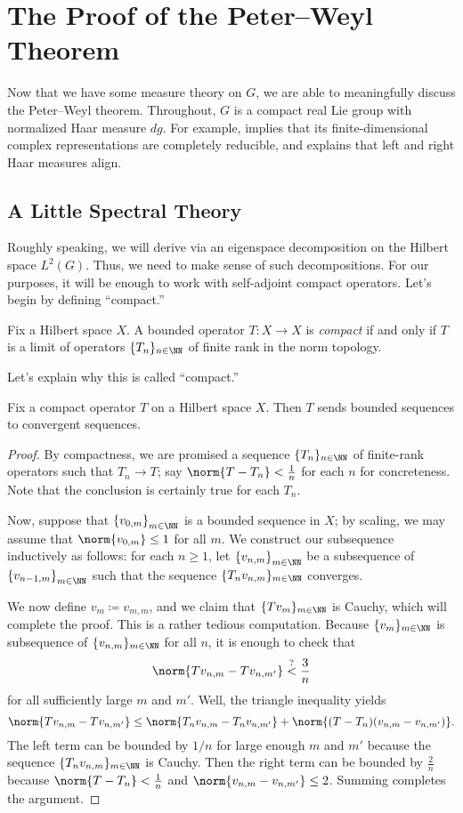 \documentclass{amsart}
\begin{document}
\section{The Proof of the Peter--Weyl Theorem} \label{sec:pw}
Now that we have some measure theory on $G$, we are able to meaningfully discuss the Peter--Weyl theorem. Throughout, $G$ is a compact real Lie group with normalized Haar measure $dg$. For example,  implies that its finite-dimensional complex representations are completely reducible, and  explains that left and right Haar measures align.

\subsection{A Little Spectral Theory}
Roughly speaking, we will derive  via an eigenspace decomposition on the Hilbert space $L^2(G)$. Thus, we need to make sense of such decompositions. For our purposes, it will be enough to work with self-adjoint compact operators. Let's begin by defining ``compact.''
\begin{definition}[compact]
	Fix a Hilbert space $X$. A bounded operator $T\colon X\to X$ is \textit{compact} if and only if $T$ is a limit of operators $\{T_n\}_{n\in\NN}$ of finite rank in the norm topology.
\end{definition}
Let's explain why this is called ``compact.''
\begin{lemma} \label{lem:compact-gives-convergence}
	Fix a compact operator $T$ on a Hilbert space $X$. Then $T$ sends bounded sequences to convergent sequences.
\end{lemma}
\begin{proof}
	By compactness, we are promised a sequence $\{T_n\}_{n\in\NN}$ of finite-rank operators such that $T_n\to T$; say $\norm{T-T_n}<\frac1n$ for each $n$ for concreteness. Note that the conclusion is certainly true for each $T_n$.

	Now, suppose that $\left\{v_{0,m}\right\}_{m\in\NN}$ is a bounded sequence in $X$; by scaling, we may assume that $\norm{v_{0,m}}\le1$ for all $m$. We construct our subsequence inductively as follows: for each $n\ge1$, let $\left\{v_{n,m}\right\}_{m\in\NN}$ be a subsequence of $\left\{v_{n-1,m}\right\}_{m\in\NN}$ such that the sequence $\{T_nv_{n,m}\}_{m\in\NN}$ converges.
	
	We now define $v_m\coloneqq v_{m,m}$, and we claim that $\{Tv_m\}_{m\in\NN}$ is Cauchy, which will complete the proof. This is a rather tedious computation. Because $\{v_m\}_{m\in\NN}$ is subsequence of $\{v_{n,m}\}_{m\in\NN}$ for all $n$, it is enough to check that
	\[\norm{Tv_{n,m}-Tv_{n,m'}}\stackrel?<\frac3n\]
	for all sufficiently large $m$ and $m'$. Well, the triangle inequality yields
	\[\norm{Tv_{n,m}-Tv_{n,m'}}\le\norm{T_nv_{n,m}-T_nv_{n,m'}}+\norm{(T-T_n)(v_{n,m}-v_{n,m'})}.\]
	The left term can be bounded by $1/n$ for large enough $m$ and $m'$ because the sequence $\{T_nv_{n,m}\}_{m\in\NN}$ is Cauchy. Then the right term can be bounded by $\frac2n$ because $\norm{T-T_n}<\frac1n$ and $\norm{v_{n,m}-v_{n,m'}}\le2$. Summing completes the argument.
\end{proof}
\end{document}
